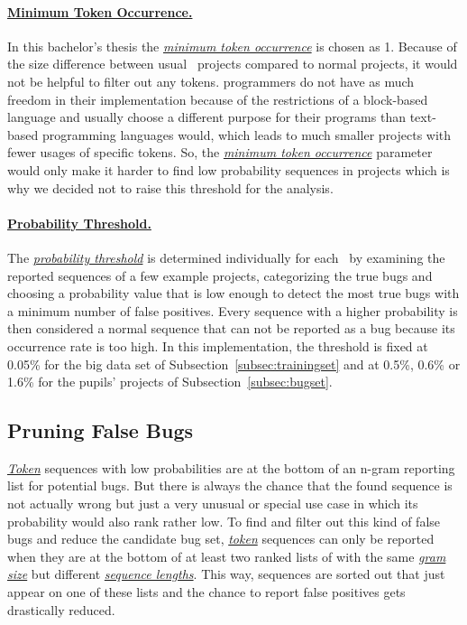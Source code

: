 \paragraph{\hyperref[def:minimum_token_occurrence]{Minimum Token Occurrence.}}
In this bachelor's thesis the \hyperref[def:minimum_token_occurrence]{\textit{minimum token occurrence}} is chosen as 1. Because of the size difference between usual \java\ projects compared to normal \scratch{} projects, it would not be helpful to filter out any tokens. \scratch{} programmers do not have as much freedom in their implementation because of the restrictions of a block-based language and usually choose a different purpose for their programs than text-based programming languages would, which leads to much smaller projects with fewer usages of specific tokens. So, the \hyperref[def:minimum_token_occurrence]{\textit{minimum token occurrence}} parameter would only make it harder to find low probability sequences in projects which is why we decided not to raise this threshold for the analysis.

\paragraph{\hyperref[def:probability_threshold]{Probability Threshold.}}
The \hyperref[def:probability_threshold]{\textit{probability threshold}} is determined individually for each \ngram\ by examining the reported sequences of a few example projects, categorizing the true bugs and choosing a probability value that is low enough to detect the most true bugs with a minimum number of false positives. Every sequence with a higher probability is then considered a normal sequence that can not be reported as a bug because its occurrence rate is too high. In this implementation, the threshold is fixed at 0.05\% for the big data set of Subsection~\ref{subsec:trainingset} and at 0.5\%, 0.6\% or 1.6\% for the pupils' projects of Subsection~\ref{subsec:bugset}. 

\subsection{Pruning False Bugs}\label{subsec:false_bugs}
\hyperref[def:token]{\textit{Token}} sequences with low probabilities are at the bottom of an n-gram reporting list for potential bugs. But there is always the chance that the found sequence is not actually wrong but just a very unusual or special use case in which its probability would also rank rather low. To find and filter out this kind of false bugs and reduce the candidate bug set, \hyperref[def:token]{\textit{token}} sequences can only be reported when they are at the bottom of at least two ranked lists of  with the same \hyperref[def:gram_size]{\textit{gram size}} but different \hyperref[def:sequence_length]{\textit{sequence lengths}}. This way, sequences are sorted out that just appear on one of these lists and the chance to report false positives gets drastically reduced. 



